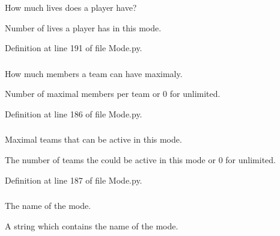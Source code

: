 How much lives does a player have? 

Number of lives a player has in this mode. 

Definition at line 191 of file Mode.py.

\hypertarget{class_mode_1_1_mode_ad4ba6cae17b92d4c8c85c35dc9418c8b}{
\subsubsection[{max\_\-team\_\-members}]{}}
\label{class_mode_1_1_mode_ad4ba6cae17b92d4c8c85c35dc9418c8b}


How much members a team can have maximaly. 

Number of maximal members per team or 0 for unlimited. 

Definition at line 186 of file Mode.py.

\hypertarget{class_mode_1_1_mode_a55c4e205a8cb20550c0f3924471522ab}{
\subsubsection[{max\_\-teams}]{}}
\label{class_mode_1_1_mode_a55c4e205a8cb20550c0f3924471522ab}


Maximal teams that can be active in this mode. 

The number of teams the could be active in this mode or 0 for unlimited. 

Definition at line 187 of file Mode.py.

\hypertarget{class_mode_1_1_mode_a38afa93ee0f4ad9e8258a510ccdbaa9c}{
\subsubsection[{name}]{}}
\label{class_mode_1_1_mode_a38afa93ee0f4ad9e8258a510ccdbaa9c}


The name of the mode. 

A string which contains the name of the mode. 

